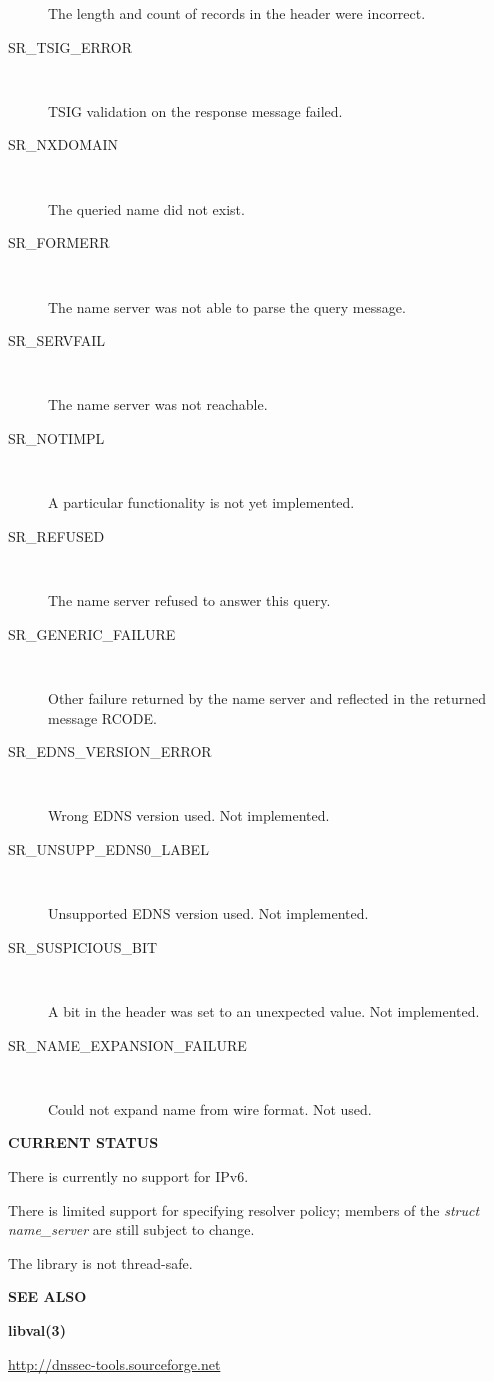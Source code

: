 \begin{description}
The length and count of records in the header were incorrect.

\item [SR\_TSIG\_ERROR]\verb" "

TSIG validation on the response message failed.

\item [SR\_NXDOMAIN]\verb" "

The queried name did not exist.

\item [SR\_FORMERR]\verb" "

The name server was not able to parse the query message.

\item [SR\_SERVFAIL]\verb" "

The name server was not reachable.

\item [SR\_NOTIMPL]\verb" "

A particular functionality is not yet implemented.

\item [SR\_REFUSED]\verb" "

The name server refused to answer this query.

\item [SR\_GENERIC\_FAILURE]\verb" "

Other failure returned by the name server and reflected in the
returned message RCODE.

\item [SR\_EDNS\_VERSION\_ERROR]\verb" "

Wrong EDNS version used.  Not implemented.

\item [SR\_UNSUPP\_EDNS0\_LABEL]\verb" "

Unsupported EDNS version used.  Not implemented.

\item [SR\_SUSPICIOUS\_BIT]\verb" "

A bit in the header was set to an unexpected value.  Not implemented.

\item [SR\_NAME\_EXPANSION\_FAILURE]\verb" "

Could not expand name from wire format.  Not used.

\end{description}

{\bf CURRENT STATUS}

There is currently no support for IPv6.

There is limited support for specifying resolver policy; members of the
{\it struct name\_server} are still subject to change.

The library is not thread-safe.

{\bf SEE ALSO}

{\bf libval(3)}

\url{http://dnssec-tools.sourceforge.net}

